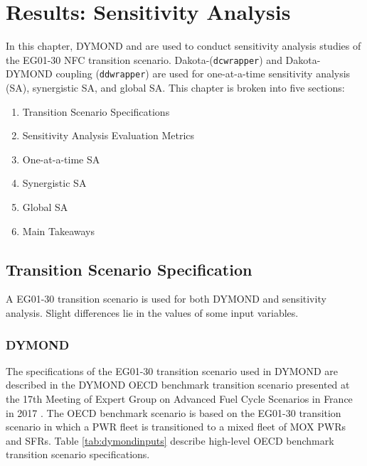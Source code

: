 \chapter{Results: Sensitivity Analysis}
In this chapter, DYMOND and \Cyclus are used to conduct 
sensitivity analysis studies of the 
EG01-30 \gls{NFC} transition scenario. 
Dakota-\Cyclus (\texttt{dcwrapper}) 
and Dakota-DYMOND coupling (\texttt{ddwrapper})
are used for 
one-at-a-time sensitivity analysis (SA), synergistic 
SA, and global SA. 
This chapter is broken into five sections: 
\begin{enumerate}
    \item Transition Scenario Specifications 
    \item Sensitivity Analysis Evaluation Metrics 
    \item One-at-a-time \gls{SA}
    \item Synergistic \gls{SA}
    \item Global \gls{SA}
    \item Main Takeaways 
\end{enumerate}

\section{Transition Scenario Specification}
A EG01-30 transition scenario is used for 
both DYMOND and \Cyclus sensitivity analysis. 
Slight differences lie in the values of some input variables. 

\subsection{DYMOND}
The specifications of the EG01-30 transition scenario used in DYMOND 
are described in the DYMOND OECD benchmark transition 
scenario presented at the 17th Meeting of Expert Group on Advanced 
Fuel Cycle Scenarios in France in 2017 
\cite{oecd_nuclear_energy_agency_wpfc_nodate}. 
The OECD benchmark scenario is based on the EG01-30 transition scenario 
in which a \gls{PWR} fleet is transitioned to
a mixed fleet of \gls{MOX} \glspl{PWR} and \glspl{SFR}. 
Table \ref{tab:dymondinputs} describe high-level OECD benchmark transition 
scenario specifications. 

